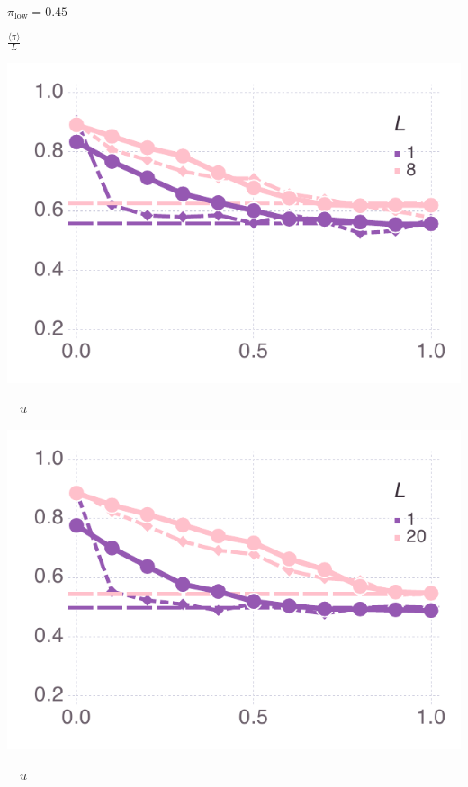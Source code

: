 \documentclass[varwidth=true,crop=false]{standalone}
\newcommand{\pisub}[1]{\pi_{\mathrm{#1}}}
\newcommand{\pilow}{\pisub{low}}
\newcommand{\meanvar}[1]{\langle #1 \rangle}
\newcommand{\meanpi}{\meanvar{\pi}}
\begin{document}
\begin{minipage}{3.75in}
    \end{minipage}~\\[0.5em]

    \begin{minipage}{3.75in}
    \begin{rotate}{90}
      {\parbox{2.5in}{
          \centering
          \vspace{-2.5em} {\huge$ \pilow = 0.45$} \\
          {\begin{rotate}{-90}{\huge $\frac{\meanpi}{L}$}\hspace{3em}\end{rotate}}
      }}
    \end{rotate}%
    \hspace{2em}
      \includegraphics[width=\textwidth]{Figures/mean_prev_net_payoff_over_u_lowpayoff=0.45_nbehaviors=4.pdf}
        \\[-2.75em]
        \begin{center}
          {\hspace{3.25em} \huge $\quad u$}
      \end{center}
        \end{minipage}\noindent\begin{minipage}{3.75in}%
      \includegraphics[width=\textwidth]{Figures/mean_prev_net_payoff_over_u_lowpayoff=0.45_nbehaviors=10.pdf}
      \\[-2.75em]
      \begin{center}
        {\huge $\quad u$}
      \end{center}
    \end{minipage}
\end{document}
